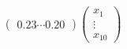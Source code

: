 \documentclass[preview]{standalone}
\begin{document}
\begin{align*}
\begin{pmatrix} 0.23 \cdots 0.20 \end{pmatrix} \begin{pmatrix} x_1\\ \vdots\\ x_{10} \end{pmatrix}
\end{align*}
\end{document}
